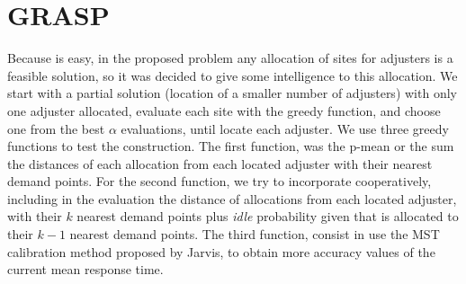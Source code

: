 \section{GRASP}
Because is easy,
in the proposed problem
any allocation of sites for adjusters
is a feasible solution,
so it was decided to give some intelligence
to this allocation.
We start with a partial solution
(location of a smaller number of adjusters)
with only one adjuster allocated,
evaluate each site with the greedy function,
and choose one from the best $\alpha$ evaluations,
until locate each adjuster.
We use three greedy functions
to test the construction.
The first function,
was the p-mean
or the sum the distances
of each allocation 
from each located adjuster
with their nearest demand points.
For the second function,
we try to incorporate cooperatively,
including in the evaluation
the distance of allocations
from each located adjuster,
with their $k$ nearest demand points
plus \textit{idle} probability
given that is allocated
to their $k-1$ nearest demand points.
The third function,
consist in use the MST calibration method
proposed by Jarvis,
to obtain more accuracy values
of the current mean response time.
